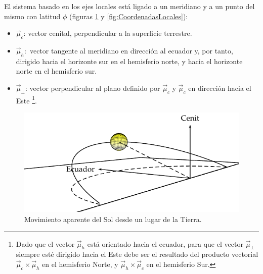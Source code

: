 El sistema basado en los ejes locales está ligado a un meridiano y
a un punto del mismo con latitud $\phi$
(figuras \ref{fig:MovimientoAparenteSol} y \ref{fig:CoordenadasLocales}):
\begin{itemize}
\item $\vec{\mu}_{c}$: vector cenital, perpendicular a la superficie terrestre.
\item $\vec{\mu}_{h}:$ vector tangente al meridiano en dirección al ecuador
y, por tanto, dirigido hacia el horizonte sur en el hemisferio norte,
y hacia el horizonte norte en el hemisferio sur.
\item $\vec{\mu}_{\bot}$: vector perpendicular al plano definido por $\vec{\mu}_{c}$
y $\vec{\mu}_{c}$ en dirección hacia el Este   %
\footnote{Dado que el vector $\vec{\mu}_{h}$ está orientado hacia el ecuador,
para que el vector $\vec{\mu}_{\bot}$ siempre esté dirigido hacia
el Este debe ser el resultado del producto vectorial $\vec{\mu}_{c}\times\vec{\mu}_{h}$
en el hemisferio Norte, y $\vec{\mu}_{h}\times\vec{\mu}_{c}$ en el
hemisferio Sur.%
}.
\end{itemize}
%
\begin{figure}
\includegraphics{../figs/SoldesdeTierra2}

\caption{Movimiento aparente del Sol desde un lugar de la Tierra.\label{fig:MovimientoAparenteSol}}

\end{figure}


